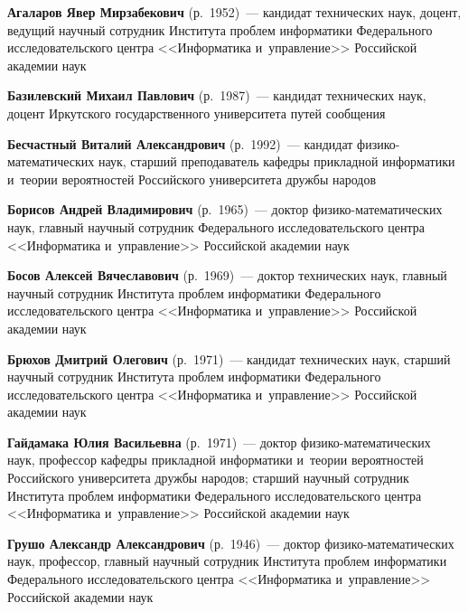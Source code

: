 \begin{multicols}{2}








\noindent
\textbf{Агаларов Явер Мирзабекович} (р.\ 1952)~--- кандидат технических наук, 
доцент, ведущий научный сотрудник Института проблем информатики Федерального 
исследовательского центра <<Информатика и~управление>> Российской академии наук

\noindent
\textbf{Базилевский Михаил Павлович} (р.\ 1987)~--- кандидат технических наук, 
доцент Иркутского государственного университета путей сообщения 


\noindent
\textbf{Бесчастный Виталий Александрович} (р.\ 1992)~--- кандидат фи\-зи\-ко-ма\-те\-ма\-ти\-че\-ских наук, 
старший преподаватель ка\-фед\-ры при\-клад\-ной информатики и~тео\-рии вероятностей Российского университета друж\-бы народов

\noindent
\textbf{Борисов Андрей Владимирович} (р.\ 1965)~--- доктор фи\-зи\-ко-ма\-те\-ма\-ти\-че\-ских наук, 
главный научный сотрудник Федерального исследовательского цент\-ра <<Информатика и~управ\-ле\-ние>>
 Российской академии наук
 
\noindent
\textbf{Босов Алексей Вячеславович} (р.\ 1969)~--- 
доктор технических наук, главный научный сотрудник Института проб\-лем информатики Федерального исследовательского цент\-ра 
<<Информатика и~управ\-ле\-ние>> Российской академии наук

\noindent
\textbf{Брюхов Дмитрий Олегович} (р.\ 1971)~--- 
кандидат технических наук, старший научный сотрудник Института проб\-лем информатики Федерального \mbox{исследовательского} цент\-ра 
<<Информатика и~управ\-ле\-ние>> Российской академии наук

\noindent
\textbf{Гайдамака Юлия Васильевна} (р.\ 1971)~--- доктор фи\-зи\-ко-ма\-те\-ма\-ти\-че\-ских наук, 
профессор ка\-фед\-ры при\-клад\-ной информатики и~тео\-рии вероятностей Российского университета друж\-бы народов;
 старший научный со\-труд\-ник Института \mbox{проб\-лем} информатики Федерального исследовательского цент\-ра <<Информатика и~управ\-ле\-ние>>
 Российской академии наук

\noindent
\textbf{Грушо Александр Александрович} (р.\ 1946)~--- доктор фи\-зи\-ко-ма\-те\-ма\-ти\-че\-ских наук, 
профессор, главный научный сотрудник Института проб\-лем информатики Федерального исследовательского цент\-ра <<Информатика и~управ\-ле\-ние>>
 Российской академии наук


\end{multicols}
